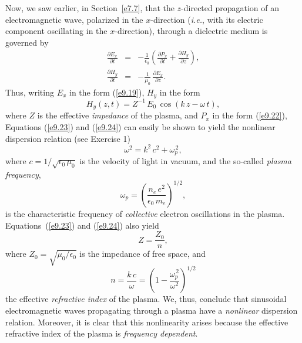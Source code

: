 Now, we saw earlier, in Section~\ref{e7.7}, that the $z$-directed propagation of an electromagnetic
wave, polarized in the $x$-direction ({\em i.e.}, with its electric component
oscillating in the $x$-direction), through a dielectric medium is
governed by
\begin{eqnarray}\label{e9.23}
\frac{\partial E_x}{\partial t}  &=&-\frac{1}{\epsilon_0}\left(\frac{\partial P_x}{\partial t} + \frac{\partial H_y}{\partial z}\right),\\[0.5ex]
\frac{\partial H_y}{\partial t} &=&-\frac{1}{\mu_0}\,\frac{\partial E_x}{\partial z}.\label{e9.24}
\end{eqnarray}
Thus, writing $E_x$ in the form (\ref{e9.19}), $H_y$ in the form
\begin{equation}
H_y(z,t) = Z^{-1}\,E_0\,\cos(k\,z-\omega\,t),
\end{equation}
where $Z$ is the effective {\em impedance}\/ of the plasma, and $P_x$ in the form (\ref{e9.22}),
Equations (\ref{e9.23}) and (\ref{e9.24})  can easily be shown to yield the nonlinear dispersion relation (see Exercise 1)
\begin{equation}\label{e9.26}
\omega^2 = k^2\,c^2+\omega_p^{\,2},
\end{equation}
where $c=1/\sqrt{\epsilon_0\,\mu_0}$ is the velocity of light in vacuum, and the
so-called {\em plasma frequency}, 
\begin{equation}\label{e9.27}
\omega_p = \left(\frac{n_e\,e^2}{\epsilon_0\,m_e}\right)^{1/2},
\end{equation}
 is the characteristic frequency of
{\em collective}\/ electron oscillations in the plasma. Equations~(\ref{e9.23}) and (\ref{e9.24}) also yield
\begin{equation}\label{e9.28}
Z = \frac{Z_0}{n},
\end{equation}
where $Z_0=\sqrt{\mu_0/\epsilon_0}$ is the impedance of free space, and
\begin{equation}\label{e9.29}
n = \frac{k\,c}{\omega} = \left(1-\frac{\omega_p^{\,2}}{\omega^2}\right)^{1/2}
\end{equation}
 the effective {\em refractive index}\/ of the plasma. We, thus, conclude that sinusoidal electromagnetic
waves propagating through a plasma have a {\em nonlinear}\/ dispersion relation.
Moreover, it is clear  that this nonlinearity arises because the effective refractive index of the plasma is {\em frequency dependent}. 

